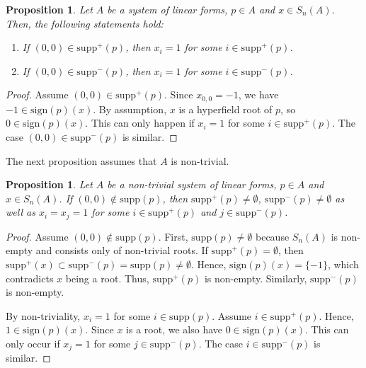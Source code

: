 \documentclass[11pt]{article}
\newtheorem{proposition}[theorem]{Proposition}
\begin{document}
\begin{proposition}
  Let $A$ be a system of linear forms, $p \in A$ and $x \in S_{n}(A)$. Then, the following statements hold:
  \begin{enumerate}
    \item If $(0,0) \in \mathrm{supp}^+(p)$, then $x_{i} = 1$ for some $i \in \mathrm{supp}^+(p)$. 
    \item If $(0,0) \in \mathrm{supp}^-(p)$, then $x_{i} = 1$ for some $i \in \mathrm{supp}^-(p)$. 
  \end{enumerate}

\end{proposition}

\begin{proof}
  Assume $(0,0) \in \mathrm{supp}^+(p)$. Since $x_{0,0} = -1$, we have $-1 \in \mathrm{sign}(p)(x)$. By assumption, $x$ is a hyperfield root of $p$, so $0 \in \mathrm{sign}(p)(x)$. This can only happen if $x_{i} = 1$ for some $i \in \mathrm{supp}^+(p)$. The case $(0,0) \in \mathrm{supp}^-(p)$ is similar.
\end{proof}

The next proposition assumes that $A$ is non-trivial. 

\begin{proposition}
  Let $A$ be a non-trivial system of linear forms, $p \in A$ and $x \in S_{n}(A)$. 
  If $(0,0) \notin \mathrm{supp}(p)$, then $\mathrm{supp}^+(p) \neq \emptyset$, $\mathrm{supp}^-(p) \neq \emptyset$ as well as $x_{i} = x_{j} = 1$ for some $i \in \mathrm{supp}^+(p)$ and $j \in \mathrm{supp}^-(p)$.
\end{proposition}

\begin{proof}
  Assume $(0,0) \notin \mathrm{supp}(p)$. First, $\mathrm{supp}(p) \neq \emptyset$ because $S_{n}(A)$ is non-empty and consists only of non-trivial roots. If $\mathrm{supp}^+(p) = \emptyset$, then $\mathrm{supp}^+(x) \subset \mathrm{supp}^-(p) = \mathrm{supp}(p) \neq \emptyset$. Hence, $\mathrm{sign}(p)(x) = \{ -1 \}$, which contradicts $x$ being a root. Thus, $\mathrm{supp}^+(p)$ is non-empty. Similarly, $\mathrm{supp}^-(p)$ is non-empty.

  By non-triviality, $x_{i} = 1$ for some $i \in \mathrm{supp}(p)$. Assume $i \in \mathrm{supp}^+(p)$. Hence, $1 \in \mathrm{sign}(p)(x)$.  Since $x$ is a root, we also have $0 \in \mathrm{sign}(p)(x)$. This can only occur if $x_{j} = 1$ for some $j \in \mathrm{supp}^-(p)$. The case $i \in \mathrm{supp}^-(p)$ is similar. 
\end{proof}
\end{document}
